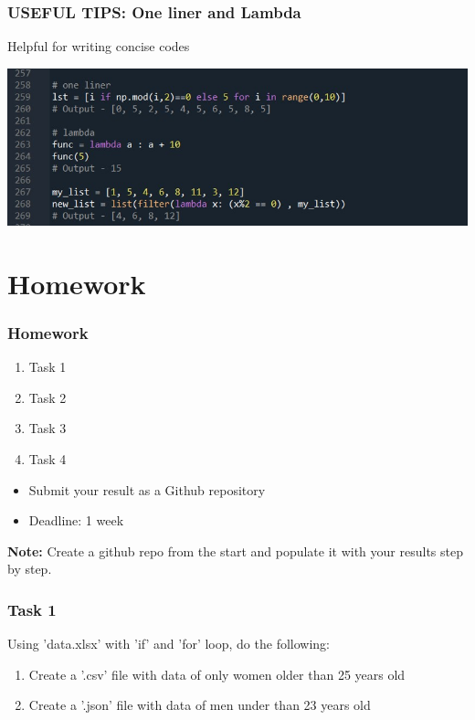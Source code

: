 \documentclass{beamer}
\begin{document}
\begin{frame}
    \frametitle{USEFUL TIPS: One liner and Lambda}
        Helpful for writing concise codes
            \begin{center}
                \includegraphics[scale=0.5]{figures/one_liner.jpg}
            \end{center}
    \end{frame}

\section{Homework} 

\begin{frame}
    \frametitle{Homework}
    \begin{enumerate}
        \item Task 1
        \item Task 2
        \item Task 3
        \item Task 4 
    \end{enumerate}

    \vskip 2mm
    \begin{itemize}
        \item Submit your result as a Github repository
        \item Deadline: 1 week %
    \end{itemize}

\vfill
\textbf{Note:} Create a github repo from the start and populate it with your results step by step.
\end{frame}

\begin{frame}
    \frametitle{Task 1}
    Using 'data.xlsx' with 'if' and 'for' loop, do the following:
    \begin{enumerate}
        \item Create a '.csv' file with data of only women older than 25 years old
        \item Create a '.json' file with data of men under than 23 years old
    \end{enumerate}
\end{frame}
\end{document}
